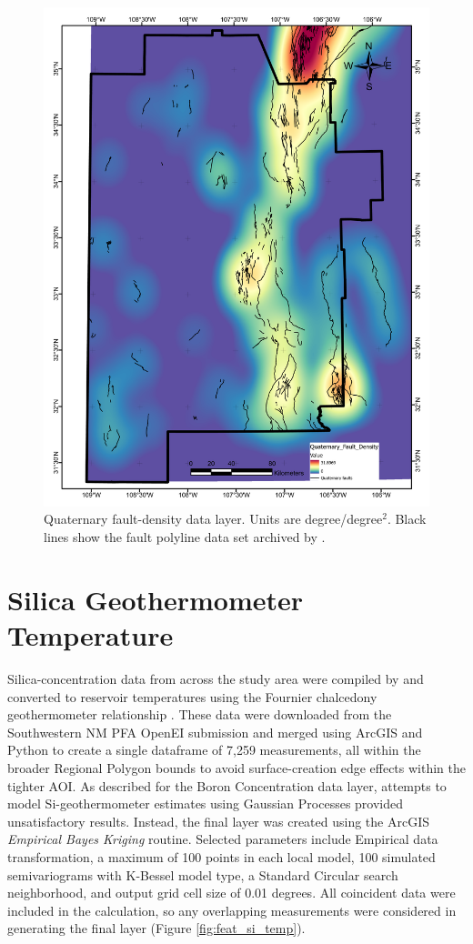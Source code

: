 \begin{figure}[H]
\centering
\includegraphics[width=0.75\linewidth]{templates/images/Figure-QFaultDensity.pdf}
\caption[Quaternary fault density data layer]{Quaternary fault-density data layer. Units are degree/degree$^2$. Black lines show the fault polyline data set archived by \protect\citet{bielicki_hydrogeolgic_2015}.}
\label{fig:feat_qfaults}
\end{figure}

\section{Silica Geothermometer Temperature}\label{app:dl_geothermometer}

Silica-concentration data from across the study area were compiled by \citet{bielicki_hydrogeolgic_2015} and converted to reservoir temperatures using the Fournier chalcedony geothermometer relationship \citep{fournier_chemical_1977}. These data were downloaded from the Southwestern NM PFA OpenEI submission \citep{kelley_geothermal_2015} and merged using ArcGIS and Python to create a single dataframe of 7,259 measurements, all within the broader Regional Polygon bounds to avoid surface-creation edge effects within the tighter AOI. As described for the Boron Concentration data layer, attempts to model Si-geothermometer estimates using Gaussian Processes provided unsatisfactory results. Instead, the final layer was created using the ArcGIS \textit{Empirical Bayes Kriging} routine. Selected parameters include Empirical data transformation, a maximum of 100 points in each local model, 100 simulated semivariograms with K-Bessel model type, a Standard Circular search neighborhood, and output grid cell size of 0.01 degrees. All coincident data were included in the calculation, so any overlapping measurements were considered in generating the final layer (Figure \ref{fig:feat_si_temp}).

